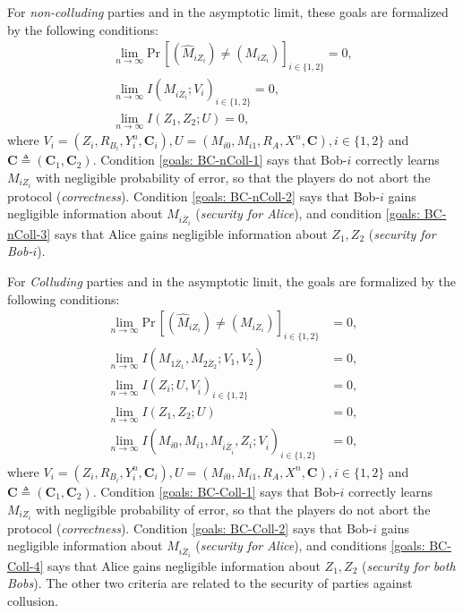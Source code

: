 \documentclass[runningheads]{llncs}
\newcommand{\parbreak}{ \vspace{0.3 em}}
\newcounter{protocol}
\begin{document}
\parbreak For \emph{non-colluding} parties and in the asymptotic limit, these goals are formalized by the following conditions:
\begin{align}\label{goals: BC-nColl-1}
    \lim_{n\rightarrow\infty}\text{Pr}\,\left[(\hat{M}_{iZ_i})\neq (M_{iZ_i})\right]_{i\in\{1,2\}}= 0,\\
    \label{goals: BC-nColl-2}
    \lim_{n\rightarrow\infty}I (  M_{i\overline{Z}_i};V_i)_{i\in\{1,2\}} = 0,\\
    \label{goals: BC-nColl-3}
    \lim_{n\rightarrow\infty}I (Z_1, Z_2 ; U) =  0,
\end{align}
where $V_i = (Z_i, R_{B_i}, Y_i^n, \mathbf{C}_i), U = (M_{i0}, M_{i1}, R_{A}, X^n , \mathbf{C}), i\in \{1,2\}$
and $\mathbf{C}\triangleq (\mathbf{C}_1, \mathbf{C}_2)$. Condition \eqref{goals: BC-nColl-1} says that Bob-$i$ correctly learns $M_{iZ_i}$ with negligible probability of error, so that the players do not abort the protocol (\emph{correctness}). Condition \eqref{goals: BC-nColl-2} says that Bob-$i$ gains negligible information about $M_{i\overline{Z}_i}$ (\emph{security for Alice}), and condition \eqref{goals: BC-nColl-3} says that Alice gains negligible information about $Z_1, Z_2$ (\emph{security for Bob-$i$}). 

\parbreak For \emph{Colluding} parties and in the asymptotic limit, the goals are formalized by the following conditions:
\begin{align}\label{goals: BC-Coll-1}
    \lim_{n\rightarrow\infty}\text{Pr}\,\left[(\hat{M}_{iZ_i})\neq (M_{iZ_i})\right]_{i\in\{1,2\}}&= 0,\\
    \label{goals: BC-Coll-2}
    \lim_{n\rightarrow\infty}I (  M_{1\overline{Z}_1},M_{2\overline{Z}_2};V_1,V_2)&= 0,\\
    \label{goals: BC-Coll-3}
    \lim_{n\rightarrow\infty}I (Z_i; U, V_{\overline{i}})_{i\in\{1,2\}} &=  0,\\\label{goals: BC-Coll-4}
    \lim_{n\rightarrow\infty}I (Z_1, Z_2 ; U) &=  0,\\\label{goals: BC-Coll-5}
    \lim_{n\rightarrow\infty}I (M_{i0},M_{i1},M_{\overline{i}\overline{Z}_{\overline{i}}}, Z_i; V_{\overline{i}})_{i\in\{1,2\}} &=  0,
\end{align}
where $V_i = (Z_i, R_{B_i}, Y_i^n, \mathbf{C}_i), U = (M_{i0}, M_{i1}, R_{A}, X^n , \mathbf{C}), i\in \{1,2\}$
and $\mathbf{C}\triangleq (\mathbf{C}_1, \mathbf{C}_2)$. Condition \eqref{goals: BC-Coll-1} says that Bob-$i$ correctly learns $M_{iZ_i}$ with negligible probability of error, so that the players do not abort the protocol (\emph{correctness}). Condition \eqref{goals: BC-Coll-2} says that Bob-$i$ gains negligible information about $M_{i\overline{Z}_i}$ (\textit{security for Alice}), and conditions \eqref{goals: BC-Coll-4} says that Alice gains negligible information about $Z_1, Z_2$ (\textit{security for both Bobs}). The other two criteria are related to the security of parties against collusion.
\end{document}
